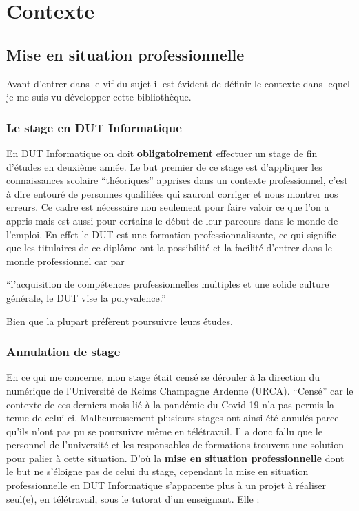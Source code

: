 \documentclass[11pt,a4paper,krantz2,11pt,oneside]{krantz}
\renewenvironment{quote}{\begin{VF}}{\end{VF}}
\begin{document}
\hypertarget{context}{%
\chapter{Contexte}\label{context}}

\hypertarget{mise-en-situation-professionnelle}{%
\section{Mise en situation professionnelle}\label{mise-en-situation-professionnelle}}

Avant d'entrer dans le vif du sujet il est évident de définir le contexte dans lequel je me suis vu développer cette bibliothèque.

\hypertarget{le-stage-en-dut-informatique}{%
\subsection{Le stage en DUT Informatique}\label{le-stage-en-dut-informatique}}

En DUT Informatique on doit \textbf{obligatoirement} effectuer un stage de fin d'études en deuxième année. Le but premier de ce stage est d'appliquer les connaissances scolaire ``théoriques'' apprises dans un contexte professionnel, c'est à dire entouré de personnes qualifiées qui sauront corriger et nous montrer nos erreurs. Ce cadre est nécessaire non seulement pour faire valoir ce que l'on a appris mais est aussi pour certains le début de leur parcours dans le monde de l'emploi. En effet le DUT est une formation professionnalisante, ce qui signifie que les titulaires de ce diplôme ont la possibilité et la facilité d'entrer dans le monde professionnel car par

\begin{quote}
``l'acquisition de compétences professionnelles multiples et une solide culture générale, le DUT vise la polyvalence.''

\end{quote}

Bien que la plupart préfèrent poursuivre leurs études.

\hypertarget{annulation-de-stage}{%
\subsection{Annulation de stage}\label{annulation-de-stage}}

En ce qui me concerne, mon stage était censé se dérouler à la direction du numérique de l'Université de Reims Champagne Ardenne (URCA). ``Censé'' car le contexte de ces derniers mois lié à la pandémie du Covid-19 n'a pas permis la tenue de celui-ci. Malheureusement plusieurs stages ont ainsi été annulés parce qu'ils n'ont pas pu se poursuivre même en télétravail. Il a donc fallu que le personnel de l'université et les responsables de formations trouvent une solution pour palier à cette situation. D'où la \textbf{mise en situation professionnelle} dont le but ne s'éloigne pas de celui du stage, cependant la mise en situation professionnelle en DUT Informatique s'apparente plus à un projet à réaliser seul(e), en télétravail, sous le tutorat d'un enseignant. Elle :
\end{document}
